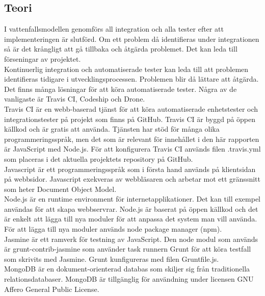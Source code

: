 \subsection{Teori}
I vattenfallsmodellen genomförs all integration och alla tester efter att implementeringen är slutförd. 
Om ett problem då identifieras under integrationen så är det krångligt att gå tillbaka och åtgärda problemet. 
Det kan leda till förseningar av projektet.\\

Kontinuerlig integration och automatiserade tester kan leda till att problemen identifieras tidigare i 
utvecklingsprocessen. Problemen blir då lättare att åtgärda.\\

Det finns många lösningar för att köra automatiserade tester. Några av de vanligaste är Travis CI, Codeship och Drone.\\

Travis CI är en webb-baserad tjänst för att köra automatiserade enhetstester och integrationstester
på projekt som finns på GitHub. Travis CI är byggd på öppen källkod och är gratis att använda. 
Tjänsten har stöd för många olika programmeringsspråk, men det som är relevant för innehållet i den här rapporten
är JavaScript med Node.js. För att konfigurera Travis CI används filen .travis.yml som placeras i det aktuella
projektets repository på GitHub.\\

Javascript är ett programmeringsspråk som i första hand används på klientsidan på webbsidor.
Javascript exekveras av webbläsaren och arbetar mot ett gränssnitt som heter Document Object Model.\\

Node.js är en runtime environment för internetapplikationer. Det kan till exempel användas för att skapa webbservrar.
Node.js är baserat på öppen källkod och det är enkelt att lägga till nya moduler för att anpassa det system man vill
använda. För att lägga till nya moduler används node package manager (npm).\\

Jasmine är ett ramverk för testning av JavaScript. 
Den node modul som används är grunt-contrib-jasmine som använder task runnern Grunt 
för att köra testfall som skrivits med Jasmine.
Grunt kunfigureras med filen Gruntfile.js.\\

MongoDB är en dokument-orienterad databas som skiljer sig från traditionella relationsdatabaser.
MongoDB är tillgänglig för användning under licensen GNU Affero General Public License.\\
